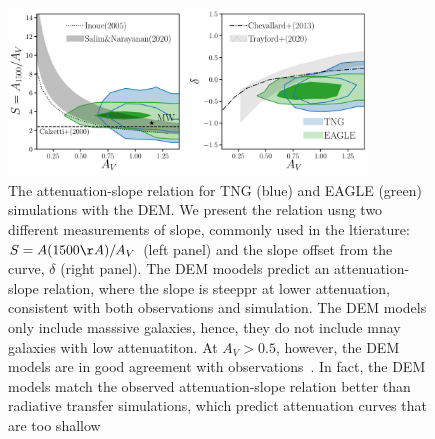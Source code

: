 
\begin{figure}
\begin{center}
    \includegraphics[width=0.85\textwidth]{figs/abc_slope_AV.pdf}
    \caption{\label{fig:slope}
    The attenuation-slope relation for TNG (blue) and EAGLE (green) simulations
    with the DEM. We present the relation usng two different measurements of slope, 
    commonly used in the ltierature: $S = A(1500\AA)/A_V$ (left panel) and
    the slope offset from the \cite{calzetti2001} curve, $\delta$ (right panel).
    The DEM moodels predict an attenuation-slope relation, where the slope is
    steeppr at lower attenuation, consistent with both observations and
    simulation. The DEM models only include masssive galaxies, hence, they do
    not include mnay galaxies with low attenuatiton. At $A_V > 0.5$, however, 
    the DEM models are in good agreement with observations~\cite{salim2020}. In
    fact, the DEM models match the observed attenuation-slope relation 
    better than radiative transfer simulations, which predict attenuation 
    curves that are too shallow~\citep{inoue2005, chevallard2013, trayford2020}
    }
\end{center}
\end{figure}

